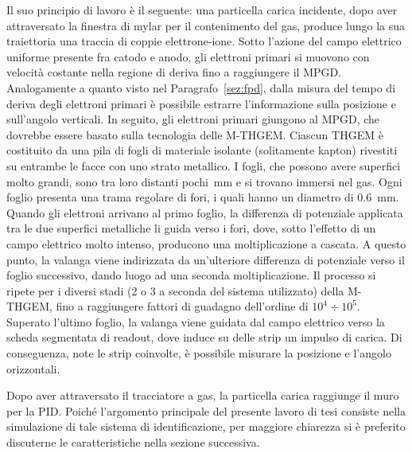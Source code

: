 Il suo principio di lavoro è il seguente: una particella carica incidente, dopo aver attraversato la finestra di mylar per il contenimento del gas, produce lungo la sua traiettoria una traccia di coppie elettrone-ione. 
Sotto l'azione del campo elettrico uniforme presente fra catodo e anodo, gli elettroni primari si muovono con velocità costante nella regione di deriva fino a raggiungere il MPGD.
Analogamente a quanto visto nel Paragrafo~\ref{sez:fpd}, dalla misura del tempo di deriva degli elettroni primari è possibile estrarre l'informazione sulla posizione e sull'angolo verticali.
In seguito, gli elettroni primari giungono al MPGD, che dovrebbe essere basato sulla tecnologia delle M-THGEM.
Ciascun THGEM è costituito da una pila di fogli di materiale isolante (solitamente kapton) rivestiti su entrambe le facce con uno strato metallico.
I fogli, che possono avere superfici molto grandi, sono tra loro distanti pochi~mm e si trovano immersi nel gas.
Ogni foglio presenta una trama regolare di fori, i quali hanno un diametro di 0.6~mm.
Quando gli elettroni arrivano al primo foglio, la differenza di potenziale applicata tra le due superfici metalliche li guida verso i fori, dove, sotto l'effetto di un campo elettrico molto intenso, producono una moltiplicazione a cascata.
A questo punto, la valanga viene indirizzata da un'ulteriore differenza di potenziale verso il foglio successivo, dando luogo ad una seconda moltiplicazione.
Il processo si ripete per i diversi stadi (2 o 3 a seconda del sistema utilizzato) della M-THGEM, fino a raggiungere fattori di guadagno dell'ordine di $10^4 \div 10^5$. 
Superato l'ultimo foglio, la valanga viene guidata dal campo elettrico verso la scheda segmentata di readout, dove induce su delle strip un impulso di carica. 
Di conseguenza, note le strip coinvolte, è possibile misurare la posizione e l'angolo orizzontali. 





Dopo aver attraversato il tracciatore a gas, la particella carica raggiunge il muro per la PID.
Poiché l'argomento principale del presente lavoro di tesi consiste nella simulazione di tale sistema di identificazione, per maggiore chiarezza si è preferito discuterne le caratteristiche nella sezione successiva.

